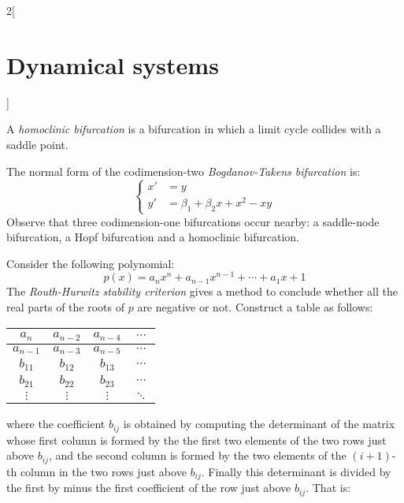 \documentclass[../../../main_math.tex]{subfiles}
\begin{document}
\begin{multicols}{2}[\section{Dynamical systems}]
\begin{theorem}
  \end{theorem}
  \begin{definition}
    A \emph{homoclinic bifurcation} is a bifurcation in which a limit cycle collides with a saddle point.
  \end{definition}
  \begin{theorem}
    The normal form of the codimension-two \emph{Bogdanov-Takens bifurcation} is:
    \begin{equation}\label{DS_eqhopf}
      \left\{
      \begin{aligned}
        x' & =y                       \\
        y' & =\beta_1+\beta_2x+x^2-xy
      \end{aligned}
      \right.
    \end{equation}
    Observe that three codimension-one bifurcations occur nearby: a saddle-node bifurcation, a Hopf bifurcation and a homoclinic bifurcation.
  \end{theorem}
  \begin{proposition}
    Consider the following polynomial: $$p(x)=a_nx^n+a_{n-1}x^{n-1}+\cdots+a_1x+1$$
    The \emph{Routh-Hurwitz stability criterion} gives a method to conclude whether all the real parts of the roots of $p$ are negative or not. Construct a table as follows:
    \begin{center}
      \def\arraystretch{1}
      \begin{tabular}{|c|c|c|c|}
        \hline
        $a_n$     & $a_{n-2}$ & $a_{n-4}$ & $\cdots$ \\
        \hline
        $a_{n-1}$ & $a_{n-3}$ & $a_{n-5}$ & $\cdots$ \\
        \hline
        $b_{11}$  & $b_{12}$  & $b_{13}$  & $\cdots$ \\
        \hline
        $b_{21}$  & $b_{22}$  & $b_{23}$  & $\cdots$ \\
        \hline
        $\vdots$  & $\vdots$  & $\vdots$  & $\ddots$ \\
        \hline
      \end{tabular}
      \label{DS_routhhurwitz}
    \end{center}
    where the coefficient $b_{ij}$  is obtained by computing the determinant of the matrix whose first column is formed by the the first two elements of the two rows just above $b_{ij}$, and the second column is formed by the two elements of the $(i+1)$-th column in the two rows just above $b_{ij}$. Finally this determinant is divided by the first by minus the first coefficient of the row just above $b_{ij}$. That is:

\end{proposition}
\end{multicols}
\end{document}

